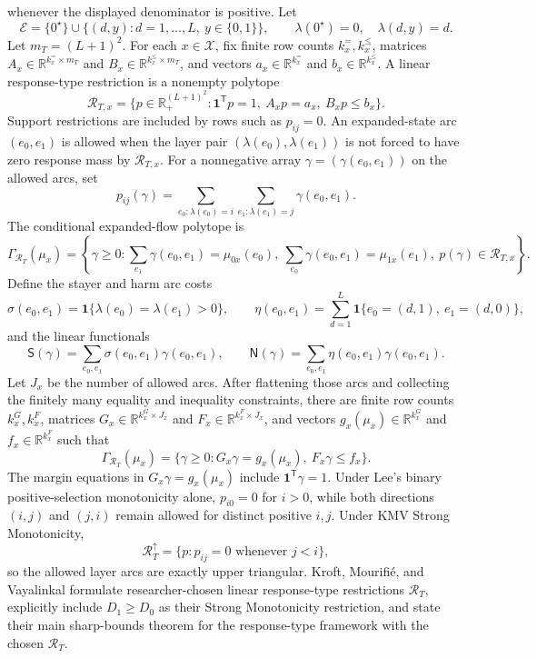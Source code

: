 whenever the displayed denominator is positive.
Let
\[\mathcal E=\{0^{\star}\}\cup\{(d,y):d=1,\ldots,L,\ y\in\{0,1\}\},\qquad
  \lambda(0^{\star})=0,\quad \lambda(d,y)=d.\]
Let \(m_T=(L+1)^2\).  For each \(x\in\mathcal X\), fix finite row counts \(k_x^=,k_x^{\le}\), matrices \(A_x\in\mathbb R^{k_x^=\times m_T}\) and \(B_x\in\mathbb R^{k_x^{\le}\times m_T}\), and vectors \(a_x\in\mathbb R^{k_x^=}\) and \(b_x\in\mathbb R^{k_x^{\le}}\).  A linear response-type restriction is a nonempty polytope
\[\mathcal R_{T,x}=\{p\in\mathbb R_+^{(L+1)^2}:\mathbf 1^{\mathsf T}p=1,\ A_xp=a_x,\ B_xp\le b_x\}.\]
Support restrictions are included by rows such as \(p_{ij}=0\).  An expanded-state arc \((e_0,e_1)\) is allowed when the layer pair \((\lambda(e_0),\lambda(e_1))\) is not forced to have zero response mass by \(\mathcal R_{T,x}\).  For a nonnegative array \(\gamma=(\gamma(e_0,e_1))\) on the allowed arcs, set
\[p_{ij}(\gamma)=\sum_{e_0:\lambda(e_0)=i}\sum_{e_1:\lambda(e_1)=j}\gamma(e_0,e_1).\]
The conditional expanded-flow polytope is
\[\Gamma_{\mathcal R_T}(\mu_x)=\left\{\gamma\ge0:
\sum_{e_1}\gamma(e_0,e_1)=\mu_{0x}(e_0),\ 
\sum_{e_0}\gamma(e_0,e_1)=\mu_{1x}(e_1),\ 
p(\gamma)\in\mathcal R_{T,x}\right\}.\]
Define the stayer and harm arc costs
\[\sigma(e_0,e_1)=\mathbf 1\{\lambda(e_0)=\lambda(e_1)>0\},\qquad
  \eta(e_0,e_1)=\sum_{d=1}^{L}\mathbf 1\{e_0=(d,1),\ e_1=(d,0)\},\]
and the linear functionals
\[\mathsf S(\gamma)=\sum_{e_0,e_1}\sigma(e_0,e_1)\gamma(e_0,e_1),\qquad
  \mathsf N(\gamma)=\sum_{e_0,e_1}\eta(e_0,e_1)\gamma(e_0,e_1).\]
Let \(J_x\) be the number of allowed arcs.  After flattening those arcs and collecting the finitely many equality and inequality constraints, there are finite row counts \(k_x^G,k_x^F\), matrices \(G_x\in\mathbb R^{k_x^G\times J_x}\) and \(F_x\in\mathbb R^{k_x^F\times J_x}\), and vectors \(g_x(\mu_x)\in\mathbb R^{k_x^G}\) and \(f_x\in\mathbb R^{k_x^F}\) such that
\[\Gamma_{\mathcal R_T}(\mu_x)=\{\gamma\ge0:G_x\gamma=g_x(\mu_x),\ F_x\gamma\le f_x\}.\]
The margin equations in \(G_x\gamma=g_x(\mu_x)\) include \(\mathbf 1^{\mathsf T}\gamma=1\).  Under Lee's binary positive-selection monotonicity alone, \(p_{i0}=0\) for \(i>0\), while both directions \((i,j)\) and \((j,i)\) remain allowed for distinct positive \(i,j\).  Under KMV Strong Monotonicity,
\[\mathcal R_T^{\uparrow}=\{p:p_{ij}=0\text{ whenever }j<i\},\]
so the allowed layer arcs are exactly upper triangular.
Kroft, Mourifi\'e, and Vayalinkal formulate researcher-chosen linear response-type restrictions \(\mathcal R_T\), explicitly include \(D_1\ge D_0\) as their Strong Monotonicity restriction, and state their main sharp-bounds theorem for the response-type framework with the chosen \(\mathcal R_T\).
